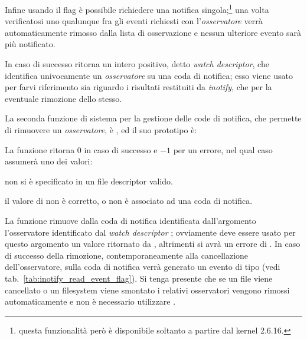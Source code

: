 Infine usando il flag  è possibile richiedere una notifica
singola;\footnote{questa funzionalità però è disponibile soltanto a partire dal
  kernel 2.6.16.} una volta verificatosi uno qualunque fra gli eventi
richiesti con  l'\textsl{osservatore} verrà
automaticamente rimosso dalla lista di osservazione e nessun ulteriore evento
sarà più notificato.

In caso di successo  ritorna un intero positivo,
detto \textit{watch descriptor}, che identifica univocamente un
\textsl{osservatore} su una coda di notifica; esso viene usato per farvi
riferimento sia riguardo i risultati restituiti da \textit{inotify}, che per
la eventuale rimozione dello stesso. 

La seconda funzione di sistema per la gestione delle code di notifica, che
permette di rimuovere un \textsl{osservatore}, è ,
ed il suo prototipo è:

\begin{funcproto}{
}

{La funzione ritorna $0$ in caso di successo e $-1$ per un errore, nel qual
  caso  assumerà uno dei valori: 
  \begin{errlist}
  \item[\errcode{EBADF}] non si è specificato in  un file descriptor
    valido.
  \item[\errcode{EINVAL}] il valore di  non è corretto, o 
    non è associato ad una coda di notifica.
  \end{errlist}
}
\end{funcproto}

La funzione rimuove dalla coda di notifica identificata dall'argomento
 l'osservatore identificato dal \textit{watch descriptor}
; ovviamente deve essere usato per questo argomento un valore
ritornato da , altrimenti si avrà un errore di
. In caso di successo della rimozione, contemporaneamente alla
cancellazione dell'osservatore, sulla coda di notifica verrà generato un
evento di tipo  (vedi
tab.~\ref{tab:inotify_read_event_flag}). Si tenga presente che se un file
viene cancellato o un filesystem viene smontato i relativi osservatori vengono
rimossi automaticamente e non è necessario utilizzare
.

